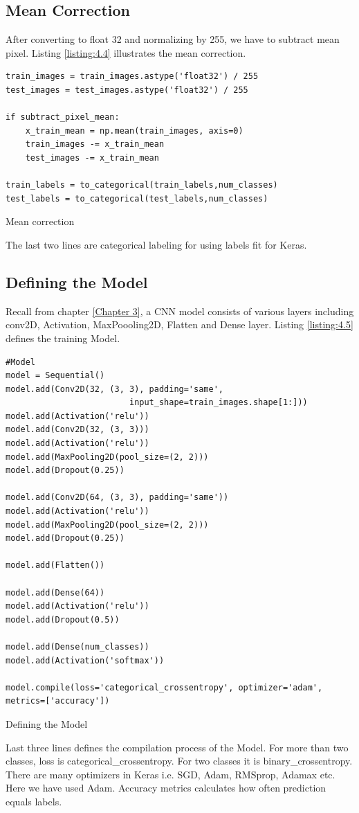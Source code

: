 \subsection{Mean Correction}
After converting to float 32 and normalizing by 255, we have to subtract mean pixel.
Listing \ref{listing:4.4} illustrates the mean correction.

\begin{listing}[H]
    \begin{verbatim}
train_images = train_images.astype('float32') / 255
test_images = test_images.astype('float32') / 255

if subtract_pixel_mean:
    x_train_mean = np.mean(train_images, axis=0)
    train_images -= x_train_mean
    test_images -= x_train_mean

train_labels = to_categorical(train_labels,num_classes)
test_labels = to_categorical(test_labels,num_classes)
    \end{verbatim}
    \caption{Mean correction}
\label{listing:4.4}
\end{listing}
\noindent The last two lines are categorical labeling for using labels fit for Keras.
\subsection{Defining the Model}
Recall from chapter \ref{Chapter 3}, a CNN model consists of various layers including
conv2D, Activation, MaxPoooling2D, Flatten and Dense layer. Listing \ref{listing:4.5}
defines the training Model.

\begin{longlisting}
    \begin{verbatim}
#Model
model = Sequential()
model.add(Conv2D(32, (3, 3), padding='same',
                         input_shape=train_images.shape[1:]))
model.add(Activation('relu'))
model.add(Conv2D(32, (3, 3)))
model.add(Activation('relu'))
model.add(MaxPooling2D(pool_size=(2, 2)))
model.add(Dropout(0.25))   

model.add(Conv2D(64, (3, 3), padding='same'))
model.add(Activation('relu'))
model.add(MaxPooling2D(pool_size=(2, 2)))
model.add(Dropout(0.25)) 
     
model.add(Flatten())

model.add(Dense(64))
model.add(Activation('relu'))
model.add(Dropout(0.5)) 

model.add(Dense(num_classes))
model.add(Activation('softmax'))

model.compile(loss='categorical_crossentropy', optimizer='adam',
metrics=['accuracy'])
    \end{verbatim}
    \caption{Defining the Model}
\label{listing:4.5}
\end{longlisting}
Last three lines defines the compilation process of the Model. 
For more than two classes, loss is categorical\_crossentropy. For two
classes it is binary\_crossentropy. There are many optimizers in Keras i.e.
SGD, Adam, RMSprop, Adamax etc. Here we have used Adam. Accuracy metrics calculates how
often prediction equals labels.
